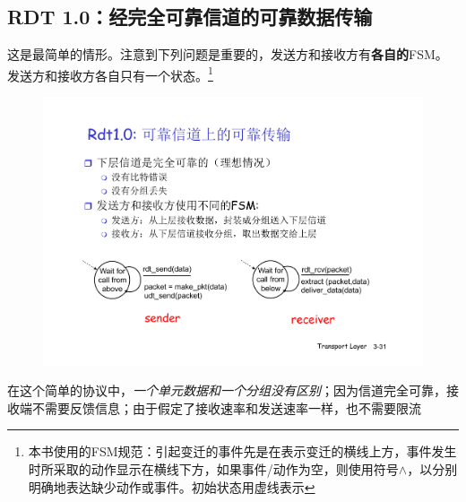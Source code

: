 \documentclass[]{report}
\begin{document}
		\subsection{RDT 1.0：经完全可靠信道的可靠数据传输}
			这是最简单的情形。注意到下列问题是重要的，发送方和接收方有\textbf{各自的}FSM。发送方和接收方各自只有一个状态。\footnote{本书使用的FSM规范：引起变迁的事件先是在表示变迁的横线上方，事件发生时所采取的动作显示在横线下方，如果事件/动作为空，则使用符号$\wedge$，以分别明确地表达缺少动作或事件。初始状态用虚线表示}
			\begin{figure}[h!]
				\centering
				\begin{minipage}{40em}
					\centering
					\includegraphics[scale = 0.4]{images/rdt_1_0.pdf}
				\end{minipage}
			\end{figure}
			在这个简单的协议中，\textit{一个单元数据和一个分组没有区别}；因为信道完全可靠，接收端不需要反馈信息；由于假定了接收速率和发送速率一样，也不需要限流
\end{document}
